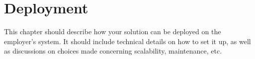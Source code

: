 \chapter{Deployment}

This chapter should describe how your solution can be deployed on the employer’s system. It should include technical details on how to set it up, as well as discussions on choices made concerning scalability, maintenance, etc.
